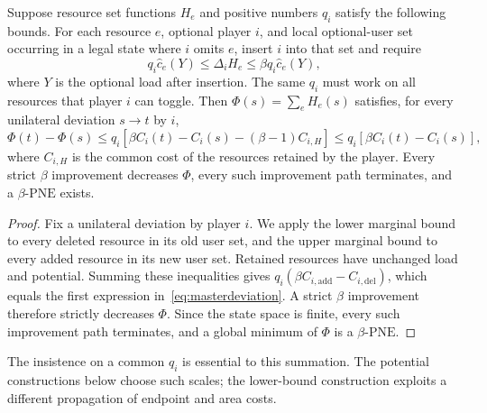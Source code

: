 \documentclass[manuscript,review,anonymous]{acmart}
\newcommand{\PNE}{\mathrm{PNE}}
\begin{document}
\begin{lemma}\label{lem:glue}
Suppose resource set functions $H_e$ and positive numbers $q_i$ satisfy the following bounds. For each resource $e$, optional player $i$, and local optional-user set occurring in a legal state where $i$ omits $e$, insert $i$ into that set and require
\begin{equation}\label{eq:mastermarginal}
 q_i\widehat c_e(Y)\le\Delta_iH_e\le\beta q_i\widehat c_e(Y),
\end{equation}
where $Y$ is the optional load after insertion. The same $q_i$ must work on all resources that player $i$ can toggle. Then $\Phi(s)=\sum_eH_e(s)$ satisfies, for every unilateral deviation $s\to t$ by $i$,
\begin{equation}\label{eq:masterdeviation}
 \Phi(t)-\Phi(s)
 \le q_i[\beta C_i(t)-C_i(s)-(\beta-1)C_{i,H}]
 \le q_i[\beta C_i(t)-C_i(s)],
\end{equation}
where $C_{i,H}$ is the common cost of the resources retained by the player. Every strict $\beta$ improvement decreases $\Phi$, every such improvement path terminates, and a $\beta$-$\PNE$ exists.
\end{lemma}
\begin{proof}
Fix a unilateral deviation by player $i$. We apply the lower marginal bound to every deleted resource in its old user set, and the upper marginal bound to every added resource in its new user set. Retained resources have unchanged load and potential. Summing these inequalities gives $q_i(\beta C_{i,\mathrm{add}}-C_{i,\mathrm{del}})$, which equals the first expression in~\eqref{eq:masterdeviation}. A strict $\beta$ improvement therefore strictly decreases $\Phi$. Since the state space is finite, every such improvement path terminates, and a global minimum of $\Phi$ is a $\beta$-$\PNE$.
\end{proof}
The insistence on a common $q_i$ is essential to this summation. The potential constructions below choose such scales; the lower-bound construction exploits a different propagation of endpoint and area costs.
\end{document}
